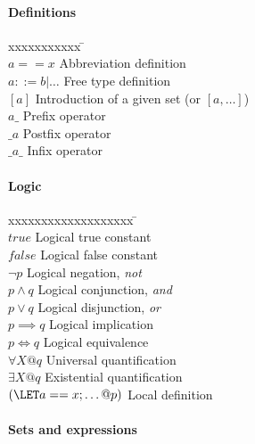 \documentclass{article}
\begin{document}
\paragraph{Definitions}

\begin{tabbing}
xxxxxxxxxxx \= \kill \\ 
$a == x$ \>  Abbreviation definition \\
$a ::= b | \dots$ \> Free type definition \\
$[a]$ \> Introduction of a given set (or $[a,\dots]$) \\
$a \_$ \> Prefix operator \\
$\_ a$ \> Postfix operator \\
$\_ a \_$ \> Infix operator \\
\end{tabbing}

\newpage

\paragraph{Logic}

\begin{tabbing}
xxxxxxxxxxxxxxxxxxx \= \kill \\ 
$true$ \> Logical true constant \\
$false$ \> Logical false constant \\
$\lnot p$ \> Logical negation, {\em not} \\
$p \land q$ \> Logical conjunction, {\em and} \\
$p \lor q$ \> Logical disjunction, {\em or} \\
$p \implies q$ \> Logical implication \\
$p \iff q$ \> Logical equivalence \\
$\forall X @ q$ \> Universal quantification \\
$\exists X @ q$ \> Existential quantification \\
$(\LET a == x; \dots @ p)$ \> Local definition \\
\end{tabbing}

\paragraph{Sets and expressions}
\end{document}
